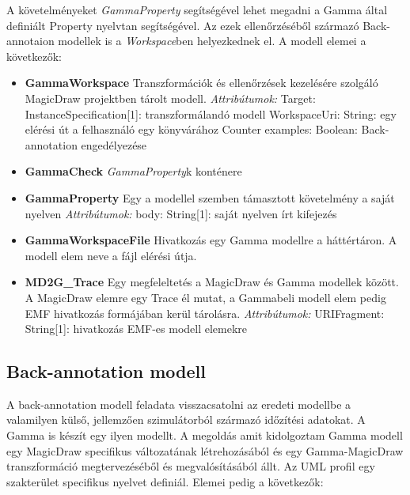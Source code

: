 A követelményeket \emph{GammaProperty} segítségével lehet megadni a Gamma által definiált Property nyelvtan segítségével. Az ezek ellenőrzéséből származó Back-annotaion modellek is a \emph{Workspace}ben helyezkednek el. A modell elemei a következők:
\begin{itemize}
	\item \textbf{GammaWorkspace} \newline
	Transzformációk és ellenőrzések kezelésére szolgáló MagicDraw projektben tárolt modell.
	\newline
	\textit{Attribútumok:}
	\subitem Target: InstanceSpecification[1]: transzformálandó modell
	\subitem WorkspaceUri: String: egy elérési út a felhasználó egy könyvárához
	\subitem Counter examples: Boolean: Back-annotation engedélyezése
	
	\item \textbf{GammaCheck} \newline
	\emph{GammaProperty}k konténere
	
	\item \textbf{GammaProperty} \newline
	Egy a modellel szemben támasztott követelmény a saját nyelven
	\newline
	\textit{Attribútumok:}
	\subitem body: String[1]: saját nyelven írt kifejezés

	\item \textbf{GammaWorkspaceFile} \newline
	Hivatkozás egy Gamma modellre a háttértáron. A modell elem neve a fájl elérési útja.
	
	\item \textbf{MD2G\_Trace} \newline
	Egy megfeleltetés a MagicDraw és Gamma modellek között. A MagicDraw elemre egy Trace él mutat, a Gammabeli modell elem pedig EMF hivatkozás formájában kerül tárolásra.
	\newline
	\textit{Attribútumok:}
	\subitem URIFragment: String[1]: hivatkozás EMF-es modell elemekre
	
	
\end{itemize}

\subsection{Back-annotation modell}
A back-annotation modell feladata visszacsatolni az eredeti modellbe a valamilyen külső, jellemzően szimulátorból származó időzítési adatokat. A Gamma is készít egy ilyen modellt. A megoldás amit kidolgoztam Gamma modell egy MagicDraw specifikus változatának létrehozásából és egy Gamma-MagicDraw transzformáció megtervezéséből és megvalósításából állt. Az UML profil egy szakterület specifikus nyelvet definiál. Elemei pedig a következők:

